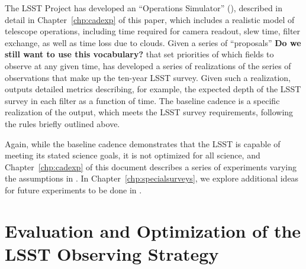   The LSST Project has developed an ``Operations Simulator'' (\OpSim),
  described in detail in Chapter~\ref{chp:cadexp} of this paper, which includes a
  realistic model of telescope operations, including time required for
  camera readout, slew time, filter exchange, as well as time loss due
  to clouds.  Given a series of ``proposals'' {\bf Do we still want to
    use this vocabulary?} that set priorities of which fields to
  observe at any given time, \OpSim has developed a series of
  realizations of the series of observations that make up the ten-year
  LSST survey.  Given such a realization, \OpSim outputs detailed
  metrics describing, for example, the expected depth of the LSST
  survey in each filter as a function of time.  The baseline cadence
  is a specific realization of the \OpSim output, which meets the LSST
  survey requirements, following the rules briefly outlined above.

  Again, while the baseline cadence demonstrates that the LSST is
  capable of meeting its stated science goals, it is not optimized for
  all science, and Chapter~\ref{chp:cadexp} of this document describes a series of
  experiments varying the assumptions in \OpSim.  In
  Chapter~\ref{chp:specialsurveys}, we explore additional ideas for
  future experiments to be done in \OpSim.


%

\navigationbar


\section{Evaluation and Optimization of the LSST Observing Strategy}
\def\secname{intro:evaluation}\label{sec:\secname}

